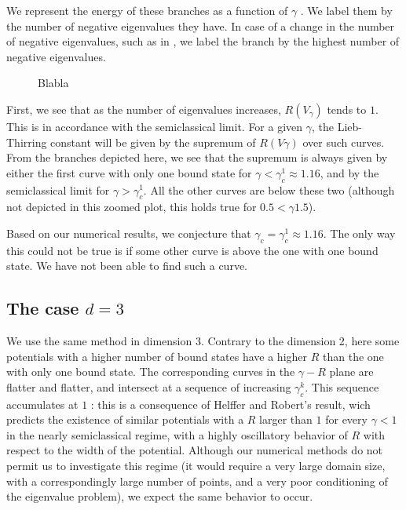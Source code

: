 \documentclass[10pt,a4paper,reqno]{amsart}
\begin{document}
We represent the energy of these branches as a function of $\gamma$
. We label them by the number of negative eigenvalues
they have. In case of a change in the number of negative eigenvalues,
such as in , we label the branch by the highest
number of negative eigenvalues.

\begin{figure}[H]
  \centering
  \caption{Blabla}
  \label{fig:2D}
\end{figure}

First, we see that as the number of eigenvalues increases,
$R(V_{\gamma})$ tends to $1$. This is in accordance with the
semiclassical limit. For a given $\gamma$, the Lieb-Thirring constant
will be given by the supremum of $R(V\gamma)$ over such curves. From
the branches depicted here, we see that the supremum is always given
by either the first curve with only one bound state for $\gamma <
\gamma_{c}^{1} \approx 1.16$, and by the semiclassical limit for
$\gamma > \gamma_{c}^{1}$. All the other curves are below these two
(although not depicted in this zoomed plot, this holds true for $0.5 <
\gamma 1.5$).

Based on our numerical results, we conjecture that $\gamma_{c} =
\gamma_{c}^{1} \approx 1.16$. The only way this could not be true is
if some other curve is above the one with one bound state. We have not
been able to find such a curve.

\subsection{The case $d = 3$}
We use the same method in dimension 3. Contrary to the dimension 2,
here some potentials with a higher number of bound states have a
higher $R$ than the one with only one bound state. The corresponding
curves in the $\gamma - R$ plane are flatter and flatter, and
intersect at a sequence of increasing $\gamma_{c}^{k}$. This sequence
accumulates at $1$ : this is a consequence of Helffer and Robert's
result\cite{helffer1990riesz}, wich predicts the existence of similar
potentials with a $R$ larger than $1$ for every $\gamma < 1$ in the
nearly semiclassical regime, with a highly oscillatory behavior of $R$
with respect to the width of the potential. Although our numerical
methods do not permit us to investigate this regime (it would require
a very large domain size, with a correspondingly large number of
points, and a very poor conditioning of the eigenvalue problem), we
expect the same behavior to occur.
\end{document}
